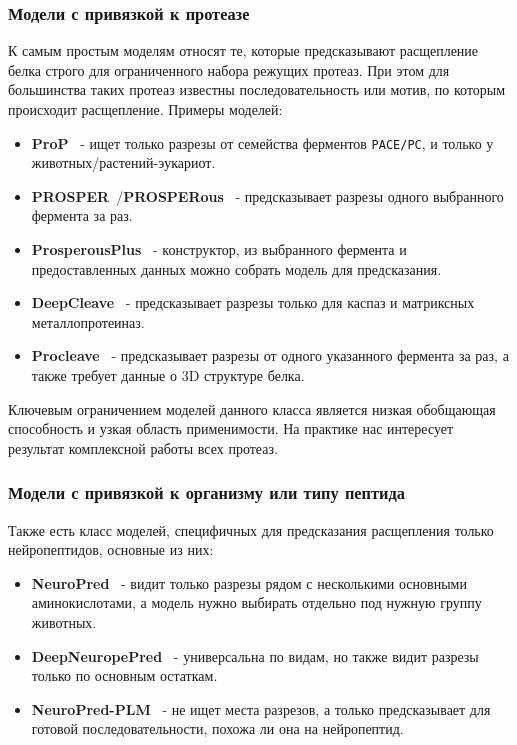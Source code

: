 \documentclass{article}
\begin{document}
\subsubsection{Модели с привязкой к протеазе}
К самым простым моделям относят те, которые предсказывают расщепление белка строго для ограниченного набора режущих протеаз. При этом для большинства таких протеаз известны последовательность или мотив, по которым происходит расщепление. Примеры моделей:
\begin{itemize}
  \item \textbf{ProP}~\cite{duckert2004prop} - ищет только разрезы от семейства ферментов \texttt{PACE/PC}, и только у животных/растений-эукариот.
  \item \textbf{PROSPER}~\cite{song2012prosper}/\textbf{PROSPERous}~\cite{song2018prosperous} - предсказывает разрезы одного выбранного фермента за раз.
  \item \textbf{ProsperousPlus}~\cite{li2023prosperousplus} - конструктор, из выбранного фермента и предоставленных данных можно собрать модель для предсказания.
  \item \textbf{DeepCleave}~\cite{li2020deepcleave} - предсказывает разрезы только для каспаз и матриксных металлопротеиназ.
  \item \textbf{Procleave}~\cite{li2020procleave} - предсказывает разрезы от одного указанного фермента за раз, а также требует данные о 3D структуре белка.
\end{itemize}

Ключевым ограничением моделей данного класса является низкая обобщающая способность и узкая область применимости. На практике нас интересует результат комплексной работы всех протеаз.

\subsubsection{Модели с привязкой к организму или типу пептида}
Также есть класс моделей, специфичных для предсказания расщепления только нейропептидов, основные из них:
\begin{itemize}
  \item \textbf{NeuroPred}~\cite{southey2006neuropred} - видит только разрезы рядом с несколькими основными аминокислотами, а модель нужно выбирать отдельно под нужную группу животных. 
  \item \textbf{DeepNeuropePred}~\cite{wang2024deepneuropepred} - универсальна по видам, но также видит разрезы только по основным остаткам. 
  \item \textbf{NeuroPred-PLM}~\cite{wang2023neuropredplm} - не ищет места разрезов, а только предсказывает для готовой последовательности, похожа ли она на нейропептид.
\end{itemize}
\end{document}
